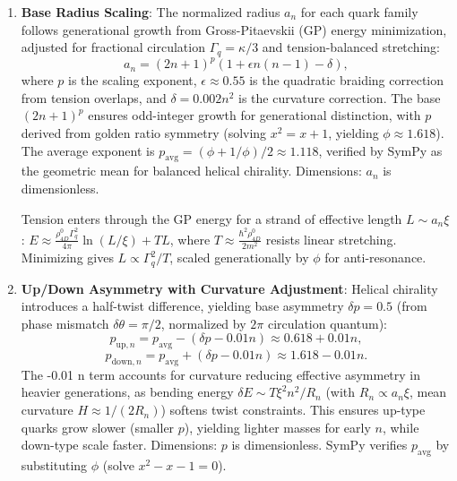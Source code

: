 \begin{enumerate}
\item \textbf{Base Radius Scaling}: The normalized radius $a_n$ for each quark family follows generational growth from Gross-Pitaevskii (GP) energy minimization, adjusted for fractional circulation $\Gamma_q = \kappa / 3$ and tension-balanced stretching:
   \[
   a_n = (2n+1)^p \left(1 + \epsilon n(n-1) - \delta \right),
   \]
   where $p$ is the scaling exponent, $\epsilon \approx 0.55$ is the quadratic braiding correction from tension overlaps, and $\delta = 0.002 n^2$ is the curvature correction. The base $(2n+1)^p$ ensures odd-integer growth for generational distinction, with $p$ derived from golden ratio symmetry (solving $x^2 = x + 1$, yielding $\phi \approx 1.618$). The average exponent is $p_{\text{avg}} = (\phi + 1/\phi)/2 \approx 1.118$, verified by SymPy as the geometric mean for balanced helical chirality. Dimensions: $a_n$ is dimensionless.

   Tension enters through the GP energy for a strand of effective length $L \sim a_n \xi$: $E \approx \frac{\rho_{4D}^0 \Gamma_q^2}{4\pi} \ln(L/\xi) + T L$, where $T \approx \frac{\hbar^2 \rho_{4D}^0}{2 m^2}$ resists linear stretching. Minimizing gives $L \propto \Gamma_q^2 / T$, scaled generationally by $\phi$ for anti-resonance.

\item \textbf{Up/Down Asymmetry with Curvature Adjustment}: Helical chirality introduces a half-twist difference, yielding base asymmetry $\delta p = 0.5$ (from phase mismatch $\delta \theta = \pi / 2$, normalized by $2\pi$ circulation quantum):
   \[
   p_{\text{up},n} = p_{\text{avg}} - (\delta p - 0.01 n) \approx 0.618 + 0.01 n,
   \]
   \[
   p_{\text{down},n} = p_{\text{avg}} + (\delta p - 0.01 n) \approx 1.618 - 0.01 n.
   \]
   The -0.01 n term accounts for curvature reducing effective asymmetry in heavier generations, as bending energy $\delta E \sim T \xi^2 n^2 / R_n$ (with $R_n \propto a_n \xi$, mean curvature $H \approx 1/(2 R_n)$) softens twist constraints. This ensures up-type quarks grow slower (smaller $p$), yielding lighter masses for early $n$, while down-type scale faster. Dimensions: $p$ is dimensionless. SymPy verifies $p_{\text{avg}}$ by substituting $\phi$ (solve $x^2 - x - 1 = 0$).


\end{enumerate}
